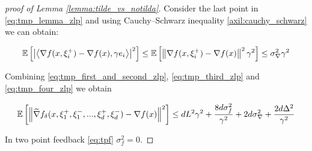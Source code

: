 \begin{proof}[proof of Lemma \ref{lemma:tilde_vs_notilda}]
        Consider the last point in \eqref{eq:tmp_lemma_zlp} and using Cauchy–Schwarz inequality \ref{axil:cauchy_schwarz} we can obtain:

        \begin{equation}
        \label{eq:tmp_four_zlp}
            \mathbb{E}\left[ \left| \left\langle \nabla f(x, \xi^+_i) - \nabla f(x),\gamma e_i \right\rangle \right|^2 \right]
            \leq
            \mathbb{E}\left[ \left\| \nabla f(x, \xi^+_i) - \nabla f(x) \right\|^2 \gamma^2 \right]
            \leq \sigma_{\nabla}^2 \gamma^2
        \end{equation}

        Combining \eqref{eq:tmp_first_and_second_zlp}, \eqref{eq:tmp_third_zlp} and \eqref{eq:tmp_four_zlp} we obtain

        \begin{equation*}
            \mathbb{E}\left[ \left\| \widetilde{\nabla}f_{\delta}(x, \xi^+_1, \xi^-_1, ... , \xi_d^+, \xi_d^-) - \nabla f(x) \right\|^2 \right] 
            \leq d L^2 \gamma^2 
            + \frac{8 d \sigma_f^2}{\gamma^2} 
            + 2 d \sigma_{\nabla}^2 + \frac{2 d \Delta^2}{\gamma^2}
        \end{equation*}

        In two point feedback \eqref{eq:tpf} $\sigma_f^2 = 0$.
    \end{proof}


